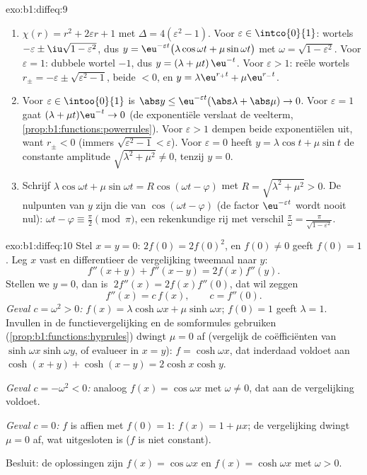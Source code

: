 \begin{solution}{exo:b1:diffeq:9}
\begin{enumerate}
  \item $\chi(r) = r^2 + 2\varepsilon r + 1$ met $\Delta =
        4(\varepsilon^2 - 1)$.
        Voor $\varepsilon \in \intco{0}{1}$: wortels $-\varepsilon \pm
        \iu\sqrt{1 - \varepsilon^2}$, dus $y = \eu^{-\varepsilon
        t}\bigl(\lambda\cos\omega t + \mu\sin\omega t\bigr)$ met
        $\omega = \sqrt{1 - \varepsilon^2}$.
        Voor $\varepsilon = 1$: dubbele wortel $-1$, dus $y = (\lambda +
        \mu t)\,\eu^{-t}$.
        Voor $\varepsilon > 1$: reële wortels $r_\pm = -\varepsilon \pm
        \sqrt{\varepsilon^2 - 1}$, beide $< 0$, en $y =
        \lambda\eu^{r_+t} + \mu\eu^{r_-t}$.
  \item Voor $\varepsilon \in \intoo{0}{1}$ is $\abs y \leq
        \eu^{-\varepsilon t}(\abs\lambda + \abs\mu) \to 0$. Voor
        $\varepsilon = 1$ gaat $(\lambda + \mu t)\eu^{-t} \to 0$ (de
        exponentiële verslaat de veelterm,
        \cref{prop:b1:functions:powerrules}). Voor $\varepsilon > 1$
        dempen beide exponentiëlen uit, want $r_\pm < 0$ (immers
        $\sqrt{\varepsilon^2 - 1} < \varepsilon$). Voor $\varepsilon =
        0$ heeft $y = \lambda\cos t + \mu\sin t$ de constante amplitude
        $\sqrt{\lambda^2 + \mu^2} \neq 0$, tenzij $y = 0$.
  \item Schrijf $\lambda\cos\omega t + \mu\sin\omega t = R\cos(\omega t
        - \varphi)$ met $R = \sqrt{\lambda^2 + \mu^2} > 0$. De
        nulpunten van $y$ zijn die van $\cos(\omega t - \varphi)$ (de
        factor $\eu^{-\varepsilon t}$ wordt nooit nul): $\omega t -
        \varphi \equiv \frac\pi2 \pmod \pi$, een rekenkundige rij met
        verschil $\frac{\pi}{\omega} = \frac{\pi}{\sqrt{1 -
        \varepsilon^2}}$.
\end{enumerate}
\end{solution}

\begin{solution}{exo:b1:diffeq:10}
Stel $x = y = 0$: $2f(0) = 2f(0)^2$, en $f(0) \neq 0$ geeft $f(0) = 1$.
Leg $x$ vast en differentieer de vergelijking tweemaal naar $y$:
\[
f''(x+y) + f''(x-y) = 2 f(x) f''(y) .
\]
Stellen we $y = 0$, dan is $\;2f''(x) = 2 f(x) f''(0)$, dat wil zeggen
\[
f''(x) = c\,f(x), \qquad c = f''(0).
\]
\emph{Geval $c = \omega^2 > 0$:} $f(x) = \lambda\cosh\omega x +
\mu\sinh\omega x$; $f(0) = 1$ geeft $\lambda = 1$. Invullen in de
functievergelijking en de somformules gebruiken
(\cref{prop:b1:functions:hyprules}) dwingt $\mu = 0$ af (vergelijk de
coëfficiënten van $\sinh\omega x \sinh\omega y$, of evalueer in $x = y$):
$f = \cosh\omega x$, dat inderdaad voldoet aan $\cosh(x+y) + \cosh(x-y) =
2\cosh x\cosh y$.

\emph{Geval $c = -\omega^2 < 0$:} analoog $f(x) = \cos\omega x$ met
$\omega \neq 0$, dat aan de vergelijking voldoet.

\emph{Geval $c = 0$:} $f$ is affien met $f(0) = 1$: $f(x) = 1 + \mu x$;
de vergelijking dwingt $\mu = 0$ af, wat uitgesloten is ($f$ is niet
constant).

Besluit: de oplossingen zijn $f(x) = \cos\omega x$ en $f(x) =
\cosh\omega x$ met $\omega > 0$.
\end{solution}

